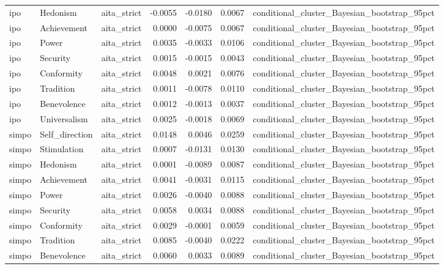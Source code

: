 \begin{tabular}{lllrrrl}
ipo & Hedonism & aita\_strict & -0.0055 & -0.0180 & 0.0067 & conditional\_cluster\_Bayesian\_bootstrap\_95pct \\
ipo & Achievement & aita\_strict & 0.0000 & -0.0075 & 0.0067 & conditional\_cluster\_Bayesian\_bootstrap\_95pct \\
ipo & Power & aita\_strict & 0.0035 & -0.0033 & 0.0106 & conditional\_cluster\_Bayesian\_bootstrap\_95pct \\
ipo & Security & aita\_strict & 0.0015 & -0.0015 & 0.0043 & conditional\_cluster\_Bayesian\_bootstrap\_95pct \\
ipo & Conformity & aita\_strict & 0.0048 & 0.0021 & 0.0076 & conditional\_cluster\_Bayesian\_bootstrap\_95pct \\
ipo & Tradition & aita\_strict & 0.0011 & -0.0078 & 0.0110 & conditional\_cluster\_Bayesian\_bootstrap\_95pct \\
ipo & Benevolence & aita\_strict & 0.0012 & -0.0013 & 0.0037 & conditional\_cluster\_Bayesian\_bootstrap\_95pct \\
ipo & Universalism & aita\_strict & 0.0025 & -0.0018 & 0.0069 & conditional\_cluster\_Bayesian\_bootstrap\_95pct \\
simpo & Self\_direction & aita\_strict & 0.0148 & 0.0046 & 0.0259 & conditional\_cluster\_Bayesian\_bootstrap\_95pct \\
simpo & Stimulation & aita\_strict & 0.0007 & -0.0131 & 0.0130 & conditional\_cluster\_Bayesian\_bootstrap\_95pct \\
simpo & Hedonism & aita\_strict & 0.0001 & -0.0089 & 0.0087 & conditional\_cluster\_Bayesian\_bootstrap\_95pct \\
simpo & Achievement & aita\_strict & 0.0041 & -0.0031 & 0.0115 & conditional\_cluster\_Bayesian\_bootstrap\_95pct \\
simpo & Power & aita\_strict & 0.0026 & -0.0040 & 0.0088 & conditional\_cluster\_Bayesian\_bootstrap\_95pct \\
simpo & Security & aita\_strict & 0.0058 & 0.0034 & 0.0088 & conditional\_cluster\_Bayesian\_bootstrap\_95pct \\
simpo & Conformity & aita\_strict & 0.0029 & -0.0001 & 0.0059 & conditional\_cluster\_Bayesian\_bootstrap\_95pct \\
simpo & Tradition & aita\_strict & 0.0085 & -0.0040 & 0.0222 & conditional\_cluster\_Bayesian\_bootstrap\_95pct \\
simpo & Benevolence & aita\_strict & 0.0060 & 0.0033 & 0.0089 & conditional\_cluster\_Bayesian\_bootstrap\_95pct \\

\end{tabular}
